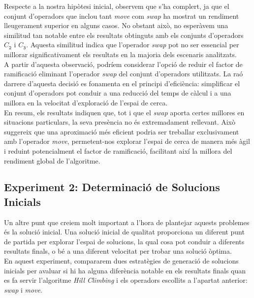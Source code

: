 \documentclass[a4paper]{article}
\begin{document}
	Respecte a la nostra hipòtesi inicial, observem que s'ha complert, ja que el conjunt d'operadors que inclou tant \textit{move} com \textit{swap} ha mostrat un rendiment lleugerament superior en alguns casos. No obstant això, no esperàvem una similitud tan notable entre els resultats obtinguts amb els conjunts d'operadors $C_{\texttt{2}}$ i $C_{\texttt{3}}$. Aquesta similitud indica que l'operador \textit{swap} pot no ser essencial per millorar significativament els resultats en la majoria dels escenaris analitzats. \\
	
	A partir d'aquesta observació, podríem considerar l'opció de reduir el factor de ramificació eliminant l'operador \textit{swap} del conjunt d'operadors utilitzats. La raó darrere d'aquesta decisió es fonamenta en el principi d'eficiència: simplificar el conjunt d'operadors pot conduir a una reducció del temps de càlcul i a una millora en la velocitat d'exploració de l'espai de cerca. \\
	
	En resum, els resultats indiquen que, tot i que el \textit{swap} aporta certes millores en situacions particulars, la seva presència no és extremadament rellevant. Això suggereix que una aproximació més eficient podria ser treballar exclusivament amb l'operador \textit{move}, permetent-nos explorar l'espai de cerca de manera més àgil i reduint potencialment el factor de ramificació, facilitant així la millora del rendiment global de l'algoritme.
	
	\subsection{Experiment 2: Determinació de Solucions Inicials}
	\label{sec:exp2}
	
	Un altre punt que creiem molt important a l'hora de plantejar aquests problemes és la solució inicial. Una solució inicial de qualitat proporciona un diferent punt de partida per explorar l'espai de solucions, la qual cosa pot conduir a diferents resultats finals, o bé a una diferent velocitat per trobar una solució òptima. \\
	
	En aquest experiment, compararem dues estratègies de generació de solucions inicials per avaluar si hi ha alguna diferència notable en els resultats finals quan es fa servir l'algoritme \textit{Hill Climbing} i els operadors escollits a l'apartat anterior: \textit{swap} i \textit{move}.\\
	
\end{document}

